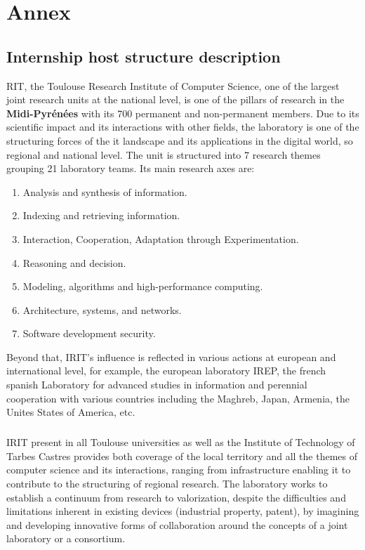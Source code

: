 %
%

\chapter{Annex}
\label{app:app01}

\section*{Internship host structure description}
RIT, the Toulouse Research Institute of Computer Science, one of the largest joint research units at the national level, is one of the pillars of research in the \textbf{Midi-Pyr\'{e}n\'{e}es} with its 700 permanent and non-permanent members. Due to its scientific impact and its interactions with other fields, the laboratory is one of the structuring forces of the \acrshort{it} landscape and its applications in the digital world, so regional and national level. The unit is structured into 7 research themes grouping 21 laboratory teams. Its main research axes are:

\begin{enumerate}
    \item  Analysis and synthesis of information.
    \item  Indexing and retrieving information.
    \item  Interaction, Cooperation, Adaptation through Experimentation.
    \item  Reasoning and decision.
    \item  Modeling, algorithms and high-performance computing.
    \item  Architecture, systems, and networks.
    \item  Software development security.
\end{enumerate}


Beyond that, IRIT's influence is reflected in various actions at european and international level, for example, the european laboratory IREP, the french spanish Laboratory for advanced studies in information and perennial cooperation with various countries including the Maghreb, Japan, Armenia, the Unites States of America, etc.

\paragraph{} IRIT present in all Toulouse universities as well as the Institute of Technology of Tarbes Castres provides both coverage of the local territory and all the themes of computer science and its interactions, ranging from infrastructure enabling it to contribute to the structuring of regional research. The laboratory works to establish a continuum from research to valorization, despite the difficulties and limitations inherent in existing devices (industrial property, patent), by imagining and developing innovative forms of collaboration around the concepts of a joint laboratory or a consortium.


